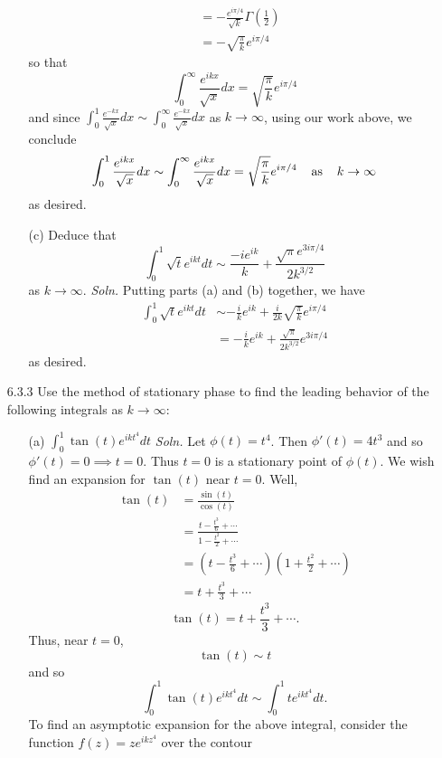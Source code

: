 \documentclass{article}
\begin{document}
\begin{itemize}
\begin{itemize}
\begin{align*}
            &= -\frac{e^{i\pi/4}}{\sqrt{k}}\Gamma\left(\frac{1}{2}\right)\\
            &= -\sqrt{\frac{\pi}{k}}e^{i\pi/4}
        \end{align*}
        so that 
        \[\int_0^{\infty} \frac{e^{ikx}}{\sqrt{x}}dx = \sqrt{\frac{\pi}{k}}e^{i\pi/4}\]
        and since ${\displaystyle \int_0^{1}\frac{e^{-kx}}{\sqrt{x}}dx \sim \int_0^{\infty} \frac{e^{-kx}}{\sqrt{x}}dx }$ as $k \to \infty$, using our work above, we conclude 
        \[\int_0^1\frac{e^{ikx}}{\sqrt{x}}dx \sim \int_0^{\infty} \frac{e^{ikx}}{\sqrt{x}}dx = \sqrt{\frac{\pi}{k}}e^{i\pi/4} \hspace{0.4cm} \text{as} \hspace{0.4cm} k \to \infty\]
        as desired.
        
        
        \item[(c)] Deduce that
        \[\int_0^1 \sqrt{t}e^{ikt}dt \sim \frac{-ie^{ik}}{k} + \frac{\sqrt{\pi}e^{3i\pi/4}}{2k^{3/2}}\]
        as $k \to \infty$.
        \newline\newline
        \textit{Soln.} Putting parts (a) and (b) together, we have
        \begin{align*}
            \int_0^1 \sqrt{t}e^{ikt}dt &\sim -\frac{i}{k}e^{ik} + \frac{i}{2k}\sqrt{\frac{\pi}{k}}e^{i\pi/4}\\
            &= -\frac{i}{k}e^{ik} + \frac{\sqrt{\pi}}{2k^{3/2}}e^{3i\pi/4}
        \end{align*}
        as desired.
    \end{itemize}

    \pagebreak

    \item[6.3.3] Use the method of stationary phase to find the leading behavior of the following integrals as $k \to \infty$:
    \begin{itemize}
        \item[(a)] ${\displaystyle \int_0^1 \tan(t) e^{ikt^4} dt}$
        \newline\newline
        \textit{Soln.} Let $\phi(t) = t^4$. Then $\phi'(t) = 4t^3$ and so $\phi'(t) = 0 \implies t = 0$. Thus $t = 0$ is a stationary point of $\phi(t)$. We wish find an expansion for $\tan(t)$ near $t = 0$. Well,
        \begin{align*}
            \tan(t) &= \frac{\sin(t)}{\cos(t)}\\
            &= \frac{t - \tfrac{t^3}{6} + \cdots}{1 - \tfrac{t^2}{2} + \cdots}\\
            &= \left(t - \frac{t^3}{6} + \cdots\right)\left(1 + \frac{t^2}{2} + \cdots\right)\\
            &= t + \frac{t^3}{3} + \cdots
        \end{align*}
        \[\tan(t) = t + \frac{t^3}{3} + \cdots.\]
        Thus, near $t = 0$,
        \[\tan(t) \sim t\]
        and so 
        \[\int_0^1\tan(t) e^{ikt^4}dt \sim \int_0^1 te^{ikt^4}dt.\]
        To find an asymptotic expansion for the above integral, consider the function $f(z) = ze^{ikz^4}$ over the contour 


\end{itemize}
\end{itemize}
\end{document}
